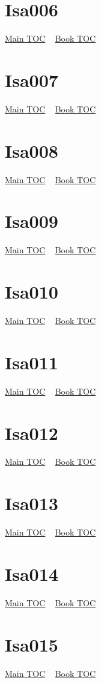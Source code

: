 \documentclass{book}
\begin{document}
  \section{Isa006}\hyperlink{toc}{Main TOC} ~ \hyperref[subsec:Isa]{Book TOC} 
  \section{Isa007}\hyperlink{toc}{Main TOC} ~ \hyperref[subsec:Isa]{Book TOC} 
  \section{Isa008}\hyperlink{toc}{Main TOC} ~ \hyperref[subsec:Isa]{Book TOC} 
  \section{Isa009}\hyperlink{toc}{Main TOC} ~ \hyperref[subsec:Isa]{Book TOC} 
  \section{Isa010}\hyperlink{toc}{Main TOC} ~ \hyperref[subsec:Isa]{Book TOC} 
  \section{Isa011}\hyperlink{toc}{Main TOC} ~ \hyperref[subsec:Isa]{Book TOC} 
  \section{Isa012}\hyperlink{toc}{Main TOC} ~ \hyperref[subsec:Isa]{Book TOC} 
  \section{Isa013}\hyperlink{toc}{Main TOC} ~ \hyperref[subsec:Isa]{Book TOC} 
  \section{Isa014}\hyperlink{toc}{Main TOC} ~ \hyperref[subsec:Isa]{Book TOC} 
  \section{Isa015}\hyperlink{toc}{Main TOC} ~ \hyperref[subsec:Isa]{Book TOC} 
\end{document}

